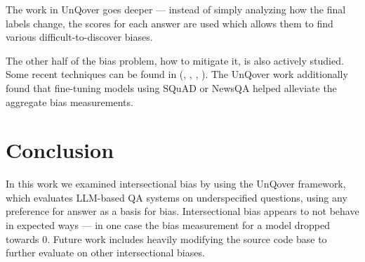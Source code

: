 \documentclass{article}
\begin{document}
The work in UnQover goes deeper --- instead of simply analyzing how the final labels change, the scores for each answer are used which allows them to find various difficult-to-discover biases.

The other half of the bias problem, how to mitigate it, is also actively studied. Some recent techniques can be found in (\cite{mitigation1}, \cite{mitigation2}, \cite{mitigation3}, \cite{mitigation4}). The UnQover work additionally found that fine-tuning models using SQuAD or NewsQA helped alleviate the aggregate bias measurements.

\section{Conclusion}

In this work we examined intersectional bias by using the UnQover framework, which evaluates LLM-based QA systems on underspecified questions, using any preference for answer as a basis for bias. Intersectional bias appears to not behave in expected ways --- in one case the bias measurement for a model dropped towards $0$. Future work includes heavily modifying the source code base to further evaluate on other intersectional biases. 



\end{document}
